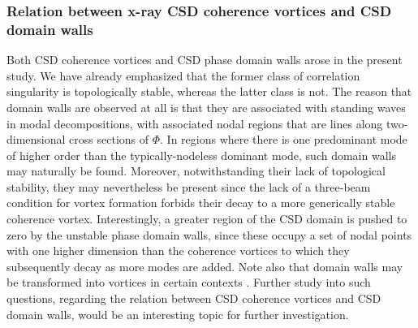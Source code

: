 \documentclass[%
 reprint,
 amsmath,amssymb,
 aps,
]{revtex4-1}
\begin{document}
\subsubsection{Relation between x-ray CSD coherence vortices and CSD domain walls} Both CSD coherence vortices and CSD phase domain walls arose in the present study.  We have already emphasized that the former class of correlation singularity is topologically stable, whereas the latter class is not.  The reason that domain walls are observed at all is that they are associated with standing waves in modal decompositions, with associated nodal regions that are lines along two-dimensional cross sections of $\Phi$.  In regions where there is one predominant mode of higher order than the typically-nodeless dominant mode, such domain walls may naturally be found.  Moreover, notwithstanding their lack of topological stability, they may nevertheless be present since the lack of a three-beam condition for vortex formation \cite{ThreeBeamCondition} forbids their decay to a more generically stable coherence vortex.  Interestingly, a greater region of the CSD domain is pushed to zero by the unstable phase domain walls, since these occupy a set of nodal points with one higher dimension than the coherence vortices to which they subsequently decay as more modes are added.  Note also that domain walls may be transformed into vortices in certain contexts \cite{PaganinOptLett2018}.  Further study into such questions, regarding the relation between CSD coherence vortices and CSD domain walls, would be an interesting topic for further investigation.  
\end{document}
